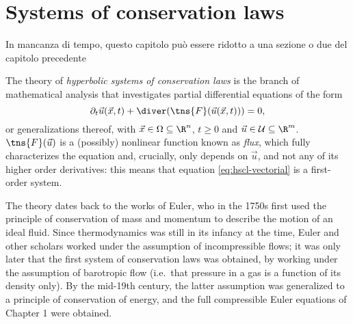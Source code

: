 \graphicspath{{./figures/chapter2/}}
\lstset{inputpath = ../MATLAB}

\chapter{Systems of conservation laws}  \label{ch:conservation-laws}


{\color{red} In mancanza di tempo, questo capitolo può essere ridotto
a una sezione o due del capitolo precedente}

The theory of \emph{hyperbolic systems of conservation laws}
is the branch of mathematical analysis that investigates
partial differential equations of the form
\begin{equation} \label{eq:hscl-vectorial}
\partial_t \vec{u}(\vec{x},t) + \diver(\tns{F}(\vec{u}(\vec{x},t))) = 0,
\end{equation}
or generalizations thereof,
with $\vec{x} \in \Omega \subseteq \R^n$, $t \geq 0$ and
$\vec{u} \in \mathcal{U} \subseteq \R^m$.
$\tns{F}(\vec{u})$ is a (possibly) nonlinear function
known as \emph{flux}, which fully characterizes the equation and,
crucially, only depends on $\vec{u}$, and not any of its higher order
derivatives: this means that equation
\eqref{eq:hscl-vectorial} is a first-order system.

The theory dates back to the works of Euler, who in the 1750s
first used the principle of conservation of mass and momentum
to describe the motion of an ideal fluid.
Since thermodynamics was still in its infancy at the time,
Euler and other scholars worked under the assumption of incompressible
flows; it was only later that the first system of conservation laws was
obtained, by working under the assumption of barotropic flow
(i.e.\ that pressure in a gas is a function of its density only).
By the mid-19th century, the latter assumption was generalized to
a principle of conservation of energy, and the full compressible Euler
equations of Chapter 1 were obtained.

